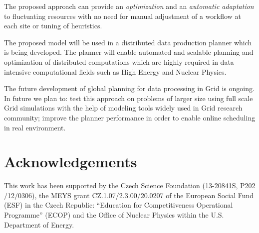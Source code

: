 \documentclass[english]{ddny}
\begin{document}

The proposed approach can provide an \textit{optimization} and an \textit{automatic adaptation} to fluctuating resources with no need for manual adjustment of a workflow at each site or tuning of heuristics.

The proposed model will be used in a distributed data production planner which is being developed. The planner will enable automated and scalable planning and optimization of distributed computations which are highly required in data intensive computational fields such as High Energy and Nuclear Physics.


The future development of global planning for data processing in Grid is ongoing. In future we plan to:
test this approach on problems of larger size using full scale Grid simulations with the help of modeling tools widely used in Grid research community;
improve the planner performance in order to enable online scheduling in real environment. 


\section*{Acknowledgements}
This work has been supported by the Czech Science Foundation
(13-20841S, P202$/$12$/$0306),  the MEYS grant CZ.1.07/2.3.00/20.0207 of the European Social Fund (ESF) in the Czech Republic: “Education for Competitiveness Operational Programme” (ECOP) and the Office of Nuclear Physics within the U.S. Department of Energy.  




{}


		
\end{document}
